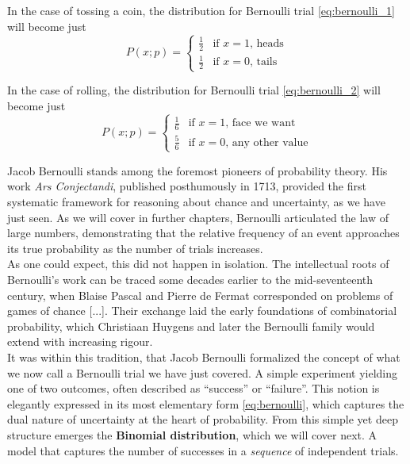 \documentclass{book}
\begin{document}
In the case of tossing a coin, the distribution for Bernoulli trial  \eqref{eq:bernoulli_1} will become just 
\begin{equation}
	P(x; p) = 
		\begin{cases}
			\frac{1}{2} & \text{if $x = 1$, heads} \\
			\frac{1}{2}& \text{if $x = 0$, tails}
		\end{cases}
\end{equation}

In the case of rolling, the distribution for Bernoulli trial  \eqref{eq:bernoulli_2} will become just 
\begin{equation}
	P(x; p) = 
		\begin{cases}
			\frac{1}{6} & \text{if $x = 1$, face we want} \\
			\frac{5}{6}& \text{if $x = 0$, any other value}
		\end{cases}
\end{equation}

Jacob Bernoulli stands among the foremost pioneers of probability theory. His work \textit{Ars Conjectandi}, published posthumously in 1713, provided the first systematic framework for reasoning about chance and uncertainty, as we have just seen. As we will cover in further chapters, Bernoulli articulated the law of large numbers, demonstrating that the relative frequency of an event approaches its true probability as the number of trials increases.\\

As one could expect, this did not happen in isolation. The intellectual roots of Bernoulli’s work can be traced some decades earlier to the mid-seventeenth century, when Blaise Pascal and Pierre de Fermat corresponded on problems of games of chance [...]. Their exchange laid the early foundations of combinatorial probability, which Christiaan Huygens and later the Bernoulli family would extend with increasing rigour.\\

It was within this tradition, that Jacob Bernoulli formalized the concept of what we now call a Bernoulli trial we have just covered. A simple experiment yielding one of two outcomes, often described as “success” or “failure”. This notion is elegantly expressed in its most elementary form \eqref{eq:bernoulli}, which captures the dual nature of uncertainty at the heart of probability. From this simple yet deep structure emerges the \textbf{Binomial distribution}, which we will cover next. A model that captures the number of successes in a \textit{sequence} of independent trials.
\end{document}
